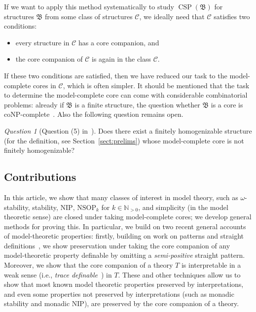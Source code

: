 \documentclass{amsart}
\theoremstyle{definition}
\theoremstyle{remark}
\newtheorem{question}[theorem]{Question}
\numberwithin{equation}{section}
\newcommand{\csp}{\operatorname{CSP}}
\newcommand{\bB}{\mathfrak{B}}
\begin{document}
If we want to apply this method systematically to study $\csp(\bB)$ for structures $\bB$ from some class of structures $\mathcal C$, we ideally need 
that ${\mathcal C}$ satisfies two conditions:
\begin{itemize}
    \item every structure in ${\mathcal C}$ has a core companion, and 
    \item the core companion of ${\mathcal C}$ is again in the class ${\mathcal C}$. 
\end{itemize}
If these two conditions are satisfied, then we have reduced our task to the model-complete cores in ${\mathcal C}$, which is often simpler. 
It should be mentioned that the task to determine the model-complete core can come with considerable combinatorial problems: already if $\bB$ is a finite structure, the question whether $\bB$ is a core is coNP-complete~\cite{cores}. Also the following question remains open. 

\begin{question}[Question (5)  in~\cite{Book}]
 \label{quest:fin-hom}   
 Does there exist a finitely homogenizable structure (for the definition, see Section~\ref{sect:prelims}) whose model-complete core is not finitely homogenizable?
\end{question}

\subsection*{Contributions}
In this article, we show that many classes of interest in model theory, such as $\omega$-stability, stability, $\mathrm{NIP}$, $\mathrm{NSOP}_k$ for $k\in \mathbb{N}_{>0}$,
and simplicity (in the model theoretic sense) are closed under taking model-complete cores; we develop general methods for proving this. 
In particular, we build on two recent general accounts of model-theoretic properties: firstly, building on work on patterns and straight definitions~\cite{saharon2000not, bailetti2024walk}, we show preservation under taking the core companion of any model-theoretic property definable by omitting a \emph{semi-positive} straight pattern.
Moreover, we show that the core companion of a theory $T$ is interpretable in a weak sense (i.e., \emph{trace definable}~\cite{walsberg2026tracedefinabilityipreservation}) in $T$. These and other techniques allow us to show that most known model theoretic properties preserved by interpretations, and even some properties not preserved by interpretations (such as monadic stability and monadic $\mathrm{NIP}$), are preserved by the core companion of a theory.
\end{document}

